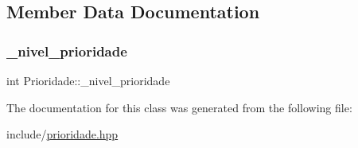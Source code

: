 \subsection{Member Data Documentation}
\mbox{\label{classPrioridade_a33d58f99a6bab88419583a66b0a8e3b5}} 
\subsubsection{\texorpdfstring{\+\_\+nivel\+\_\+prioridade}{\_nivel\_prioridade}}
{\footnotesize\ttfamily int Prioridade\+::\+\_\+nivel\+\_\+prioridade\hspace{0.3cm}{\ttfamily [private]}}



The documentation for this class was generated from the following file\+:\begin{DoxyCompactItemize}
\item 
include/\hyperlink{prioridade_8hpp}{prioridade.\+hpp}\end{DoxyCompactItemize}
